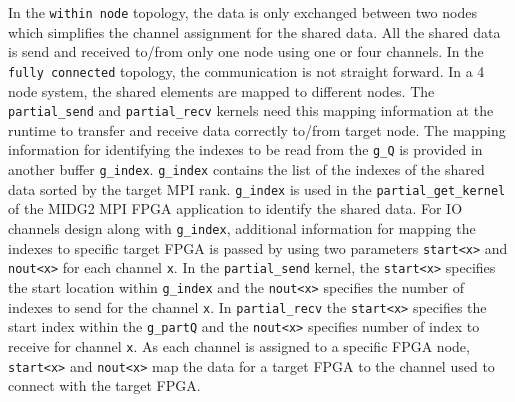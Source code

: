 In the \texttt{within node} topology, the data is only exchanged between two nodes
which simplifies the channel assignment for the shared data. All the shared data is send and received
to/from only one node using one or four channels. In the \texttt{fully connected} topology,
the communication is not straight forward. In a 4 node system, the shared elements are mapped
to different nodes. The \texttt{partial\_send} and \texttt{partial\_recv} kernels need this mapping
information at the runtime to transfer and receive data correctly to/from target node. The mapping information
for identifying the indexes to be read from the \texttt{g\_Q} is provided in another buffer
\texttt{g\_index}. \texttt{g\_index} contains the list of the indexes of the shared data
sorted by the target MPI rank. \texttt{g\_index} is used in the \texttt{partial\_get\_kernel}
of the MIDG2 MPI FPGA application to identify the shared data. For IO channels design along with
\texttt{g\_index}, additional information for mapping the indexes to specific target FPGA is
passed by using two parameters \texttt{start<x>} and \texttt{nout<x>} for each channel \texttt{x}.
In the \texttt{partial\_send} kernel, the \texttt{start<x>} specifies the start location within \texttt{g\_index}
and the \texttt{nout<x>} specifies the number of indexes to send for the channel \texttt{x}. In
\texttt{partial\_recv} the \texttt{start<x>} specifies the start index within the \texttt{g\_partQ}
and the \texttt{nout<x>} specifies number of index to receive for channel \texttt{x}. As each
channel is assigned to a specific FPGA node, \texttt{start<x>} and \texttt{nout<x>} map
the data for a target FPGA to the channel used to connect with the target FPGA.


